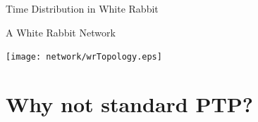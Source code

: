 \documentclass[compress,red]{beamer}
\begin{document}
\begin{frame}{Time Distribution in White Rabbit}

\center A White Rabbit Network
  \begin{center}
  \texttt{[image: network/wrTopology.eps]}
  \end{center}
\end{frame}
\section{Why not standard PTP?}
\end{document}
